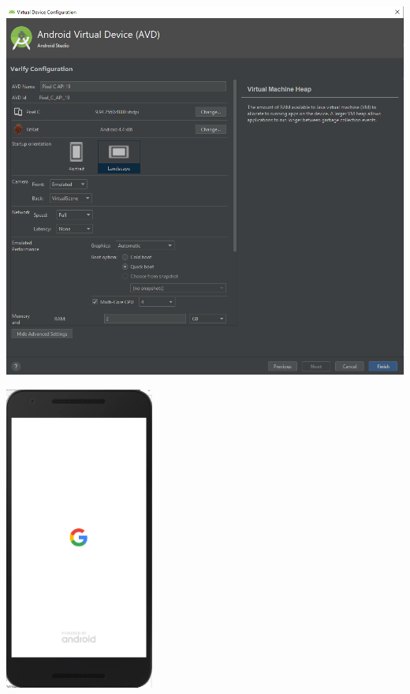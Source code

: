 \documentclass[answers]{exam}
\begin{document}
\begin{questions}
\begin{framed}
\begin{center}
        \includegraphics[width=15.5cm]{img/AndroidVirtualDevices_03.png}
    \end{center}
    \begin{center}
        \includegraphics[height=10cm]{img/AndroidVirtualDevices_04.png}
        \hspace{1cm}

\end{center}
\end{framed}
\end{questions}
\end{document}
